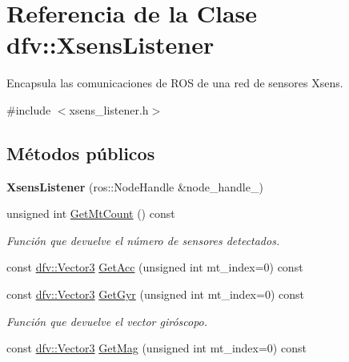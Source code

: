 \hypertarget{classdfv_1_1XsensListener}{\section{\-Referencia de la \-Clase dfv\-:\-:\-Xsens\-Listener}
\label{classdfv_1_1XsensListener}
}


\-Encapsula las comunicaciones de \-R\-O\-S de una red de sensores \-Xsens.  




{\ttfamily \#include $<$xsens\-\_\-listener.\-h$>$}

\subsection*{\-Métodos públicos}
\begin{DoxyCompactItemize}
\item 
\hypertarget{classdfv_1_1XsensListener_a545d4b10d2c34166d82bc41403e39a00}{{\bfseries \-Xsens\-Listener} (ros\-::\-Node\-Handle \&node\-\_\-handle\-\_\-)}\label{classdfv_1_1XsensListener_a545d4b10d2c34166d82bc41403e39a00}

\item 
\hypertarget{classdfv_1_1XsensListener_a5d31c2bd34dcbd18c60634e994c02ed3}{unsigned int \hyperlink{classdfv_1_1XsensListener_a5d31c2bd34dcbd18c60634e994c02ed3}{\-Get\-Mt\-Count} () const }\label{classdfv_1_1XsensListener_a5d31c2bd34dcbd18c60634e994c02ed3}

\begin{DoxyCompactList}\small\item\em \-Función que devuelve el número de sensores detectados. \end{DoxyCompactList}\item 
const \hyperlink{classdfv_1_1Vector3}{dfv\-::\-Vector3} \hyperlink{classdfv_1_1XsensListener_a940577a890abfe31a9f765766abbb0ec}{\-Get\-Acc} (unsigned int mt\-\_\-index=0) const 
\item 
\hypertarget{classdfv_1_1XsensListener_a3896a0a58d557a5e9299415a146d80ed}{const \hyperlink{classdfv_1_1Vector3}{dfv\-::\-Vector3} \hyperlink{classdfv_1_1XsensListener_a3896a0a58d557a5e9299415a146d80ed}{\-Get\-Gyr} (unsigned int mt\-\_\-index=0) const }\label{classdfv_1_1XsensListener_a3896a0a58d557a5e9299415a146d80ed}

\begin{DoxyCompactList}\small\item\em \-Función que devuelve el vector giróscopo. \end{DoxyCompactList}\item 
\hypertarget{classdfv_1_1XsensListener_a5eb779af51de20f10434711cb06ea153}{const \hyperlink{classdfv_1_1Vector3}{dfv\-::\-Vector3} \hyperlink{classdfv_1_1XsensListener_a5eb779af51de20f10434711cb06ea153}{\-Get\-Mag} (unsigned int mt\-\_\-index=0) const }\label{classdfv_1_1XsensListener_a5eb779af51de20f10434711cb06ea153}


\end{DoxyCompactItemize}

